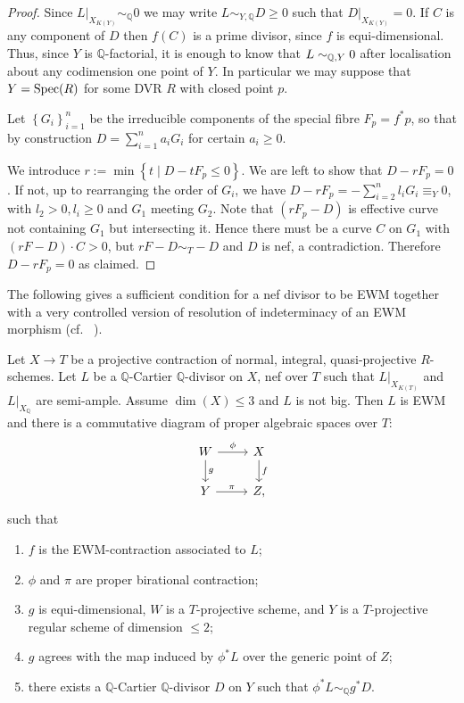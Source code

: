 \begin{proof}
	Since $L|_{X_{K(Y)}} \sim_{\mathbb{Q}} 0$ we may write $L\sim_{Y, \mathbb{Q}} D\geq 0$ such that $D|_{X_{K(Y)}}=0$. If $C$ is any component of $D$ then $f(C)$ is a prime divisor, since $f$ is equi-dimensional. Thus, since $Y$ is $\mathbb{Q}$-factorial, it is enough to know that $L \sim_{\mathbb{Q},Y} 0$ after localisation about any codimension one point of $Y$. In particular we may suppose that $Y= \operatorname{Spec} (R)$ for some DVR $R$ with closed point $p$.
	
	Let $\left\{G_i \right\}_{i=1}^n$ be the irreducible components of the special fibre $F_p=f^*p$, so that by construction $D = \sum_{i=1}^n a_i G_i$ for certain $a_i \geq 0$.	
	
	We introduce $r:= \min \left\{ t \mid D -tF_p \leq 0 \right\}$. We are left to show that $D-rF_p=0$. 
	If not, up to rearranging the order of $G_i$, we have $D-rF_p=-\sum_{i=2}^n l_i G_i \equiv_Y 0$, with $l_2 >0, l_i \geq 0$ and $G_{1}$ meeting $G_{2}$. Note that $(rF_p-D)$ is effective curve not containing $G_{1}$ but intersecting it. Hence there must be a curve $C$ on $G_{1}$ with $(rF-D) \cdot C >0$, but $rF-D \sim_{T} -D$ and $D$ is nef, a contradiction. Therefore $D-rF_p=0$ as claimed.
\end{proof}


The following gives a sufficient condition for a nef divisor to be EWM together with a very controlled version of resolution of indeterminacy of an EWM morphism (cf.~ \cite[Lemma 9.25]{bhatt2020}).

\begin{lemma}\label{two}
	Let $X \to T$ be a projective contraction of normal, integral, quasi-projective $R$-schemes.
	Let $L$ be a $\mathbb{Q}$-Cartier $\mathbb{Q}$-divisor on $X$, nef over $T$ such that $L|_{X_{K(T)}}$ and $L|_{X_{\mathbb{Q}}}$ are semi-ample.
	Assume $\dim (X) \leq 3$ and $L$ is not big. 
	Then $L$ is EWM and there is a commutative diagram of proper algebraic spaces over $T$:
	\[
	\begin{tikzcd}
	W \arrow[d, "g"] \arrow[r, "\phi"] & X \arrow[d, "f"] \\
	Y \arrow[r, "\pi"]                 & Z      ,        
	\end{tikzcd}
	\]
	such that 
	\begin{enumerate}
		\item $f$ is the EWM-contraction associated to $L$;
		\item $\phi$ and $\pi$ are proper birational contraction;
		\item  $g$ is equi-dimensional, $W$ is a $T$-projective scheme, and $Y$ is a $T$-projective regular scheme of dimension $\leq 2$;
		\item $g$ agrees with the map induced by $\phi^*L$ over the generic point of $Z$;
		\item  there exists a $\mathbb{Q}$-Cartier $\mathbb{Q}$-divisor $D$ on $Y$ such that $\phi^{*}L \sim_{\mathbb{Q}} g^{*}D$.
	\end{enumerate}  
\end{lemma}

